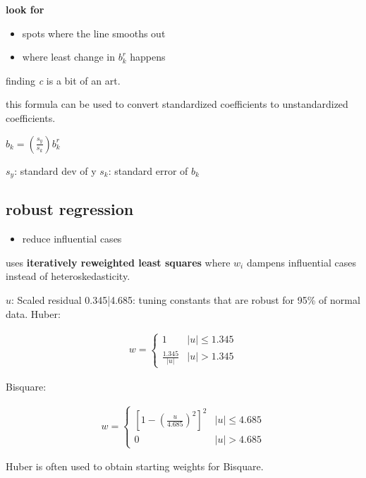 \documentclass[11pt]{article}
\begin{document}
\textbf{look for}
\begin{itemize}
\item spots where the line smooths out
\item where least change in \(b_k^r\) happens
\end{itemize}

finding \emph{c} is a bit of an art.

this formula can be used to convert standardized coefficients to unstandardized
coefficients.

\(b_k = (\frac{s_y}{s_k}) b_k^r\)

\(s_y\): standard dev of y
\(s_k\): standard error of \(b_k\)

\subsection{robust regression}
\label{sec:org94a0fff}
\begin{itemize}
\item reduce influential cases
\end{itemize}

uses \textbf{iteratively reweighted least squares} where \(w_i\) dampens influential
cases instead of heteroskedasticity.


\(u\): Scaled residual
0.345|4.685: tuning constants that are robust for 95\% of normal data.
Huber:

\begin{equation}
\begin{split}
w = \begin{cases}
1 & |u| \leq 1.345\\
\frac{1.345}{|u|} & |u| > 1.345
\end{cases}
\end{split}
\end{equation}

Bisquare:

\begin{equation}
\begin{split}
w = \begin{cases}
[1 - (\frac{u}{4.685})^2]^2 & |u| \leq 4.685\\
0 & |u| > 4.685
\end{cases}
\end{split}
\end{equation}

Huber is often used to obtain starting weights for Bisquare.
\end{document}
